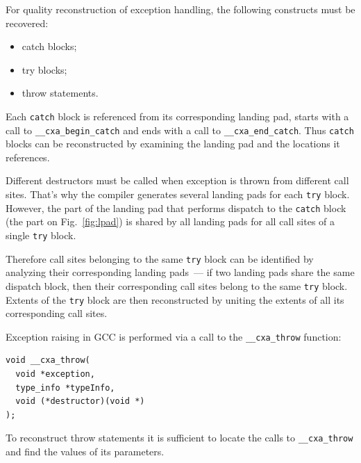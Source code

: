 \documentclass[10pt, conference, compsocconf]{IEEEtran}
\newcommand{\compact}{}
\newcommand{\skipspace}{}
\begin{document}

For quality reconstruction of exception handling, the following constructs must be recovered:
\skipspace\begin{itemize}\compact
\item catch blocks;
\item try blocks;
\item throw statements.
\end{itemize}

Each \lstinline{catch} block is referenced from its corresponding landing pad,
starts with a call to \lstinline{__cxa_begin_catch}
and ends with a call to \lstinline{__cxa_end_catch}.
Thus \lstinline{catch} blocks can be reconstructed by examining
the landing pad and the locations it references.

Different destructors must be called when exception is thrown from
different call sites. That's why the compiler generates several landing
pads for each \lstinline{try} block.
However, the part of the landing pad that performs dispatch to
the \lstinline{catch} block (the part on Fig.~\ref{fig:lpad}) is shared by all
landing pads for all call sites of a single \lstinline{try} block.

Therefore call sites belonging to the same \lstinline{try} block can be identified
by analyzing their corresponding landing pads~--- if two landing pads
share the same dispatch block, then their corresponding call sites
belong to the same \lstinline{try} block. Extents of the \lstinline{try}
block are then reconstructed by uniting the extents of all its corresponding
call sites.

Exception raising in GCC is performed via a call to the \lstinline{__cxa_throw} function:
{
\lstset{basicstyle=\footnotesize}
\begin{lstlisting}
void __cxa_throw(
  void *exception,
  type_info *typeInfo,
  void (*destructor)(void *)
);
\end{lstlisting}
}

To reconstruct throw statements it is sufficient to locate the calls
to \lstinline{__cxa_throw} and find the values of its parameters.

\end{document}
